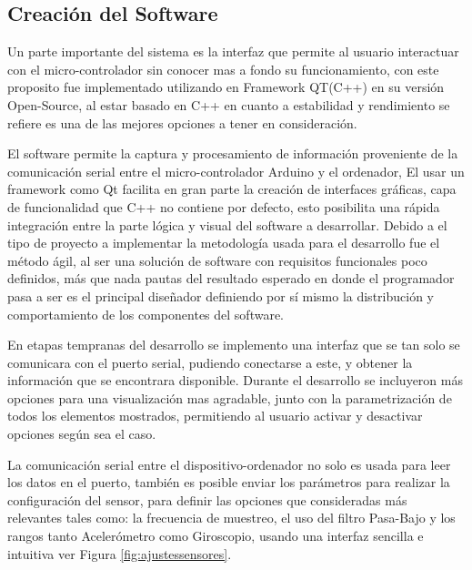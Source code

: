 \documentclass[12pt,a4paper]{article}
\begin{document}
			
			\subsection{Creación del Software}
			Un parte importante del sistema es la interfaz que permite al usuario interactuar con el micro-controlador sin conocer mas a fondo su funcionamiento,
			con este proposito fue implementado utilizando en Framework QT(C++)\cite{QT} en su versión Open-Source, al estar basado en C++ en cuanto a estabilidad y rendimiento se refiere es una de las mejores opciones a tener en consideración.
			
			El software permite la captura y procesamiento de información proveniente de la comunicación serial entre el micro-controlador Arduino y el ordenador,
			El usar un framework como Qt facilita en gran parte la creación de interfaces gráficas, capa de funcionalidad que C++ no contiene por defecto, esto posibilita una rápida integración entre la parte lógica y visual del software a desarrollar.
			Debido a el tipo de proyecto a implementar la metodología usada para el desarrollo fue el método ágil, al ser una solución de software con requisitos funcionales poco definidos, más que nada pautas del resultado esperado en donde el programador pasa a ser es el principal diseñador definiendo por sí mismo la distribución y comportamiento de los componentes del software.
			
			En etapas tempranas del desarrollo se implemento una interfaz que se tan solo se comunicara con el puerto serial, pudiendo conectarse a este, y obtener la información que se encontrara disponible.
			Durante el desarrollo se incluyeron más opciones para una visualización mas agradable, junto con la parametrización de todos los elementos mostrados, permitiendo al usuario activar y desactivar opciones según sea el caso.
			
			La comunicación serial entre el dispositivo-ordenador no solo es usada para leer los datos en el puerto, también es posible enviar los parámetros para realizar la configuración del sensor, para definir las opciones que consideradas más relevantes tales como: la frecuencia de muestreo, el uso del filtro Pasa-Bajo y los rangos tanto Acelerómetro como Giroscopio, usando una interfaz sencilla e intuitiva ver Figura \ref{fig:ajustessensores}.
			
\end{document}
